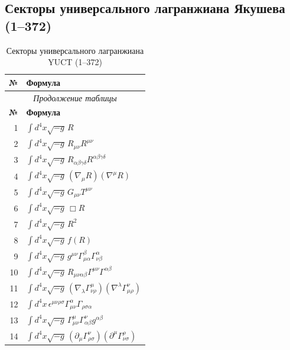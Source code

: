 \documentclass[12pt,a4paper]{article}
\begin{document}
	\subsection{Секторы универсального лагранжиана Якушева (1–372)}
	\label{sec:sectors}
	
	\scriptsize
	\begin{longtable}{r p{}}
		\caption{Секторы универсального лагранжиана YUCT (1–372)}\label{tab:sectors-372}\\
		\toprule
		\textbf{№} & \textbf{Формула} \\
		\midrule
		\endfirsthead
		\multicolumn{2}{c}{\textit{Продолжение таблицы}}\\
		\toprule
		\textbf{№} & \textbf{Формула} \\
		\midrule
		\endhead
		\bottomrule
		\endfoot
		1 & \(\displaystyle \int d^4x\sqrt{-g}\,R\) \\
		2 & \(\displaystyle \int d^4x\sqrt{-g}\,R_{\mu\nu}R^{\mu\nu}\) \\
		3 & \(\displaystyle \int d^4x\sqrt{-g}\,R_{\alpha\beta\gamma\delta}R^{\alpha\beta\gamma\delta}\) \\
		4 & \(\displaystyle \int d^4x\sqrt{-g}\,(\nabla_\mu R)(\nabla^\mu R)\) \\
		5 & \(\displaystyle \int d^4x\sqrt{-g}\,G_{\mu\nu}T^{\mu\nu}\) \\
		6 & \(\displaystyle \int d^4x\sqrt{-g}\,\Box R\) \\
		7 & \(\displaystyle \int d^4x\sqrt{-g}\,R^2\) \\
		8 & \(\displaystyle \int d^4x\sqrt{-g}\,f(R)\) \\
		9 & \(\displaystyle \int d^4x\sqrt{-g}\,g^{\mu\nu}\Gamma^{\beta}_{\mu\alpha}\Gamma^{\alpha}_{\nu\beta}\) \\
		10 & \(\displaystyle \int d^4x\sqrt{-g}\,R_{\mu\nu\alpha\beta}\Gamma^{\mu\nu}\Gamma^{\alpha\beta}\) \\
		11 & \(\displaystyle \int d^4x\sqrt{-g}\,(\nabla_\lambda\Gamma^{\mu}_{\nu\rho})(\nabla^\lambda\Gamma^{\nu}_{\mu\rho})\) \\
		12 & \(\displaystyle \int d^4x\,\epsilon^{\mu\nu\rho\sigma}\Gamma^{\alpha}_{\mu\nu}\Gamma_{\rho\sigma\alpha}\) \\
		13 & \(\displaystyle \int d^4x\sqrt{-g}\,\Gamma^{\mu}_{\mu\nu}\Gamma^{\nu}_{\alpha\beta}g^{\alpha\beta}\) \\
		14 & \(\displaystyle \int d^4x\sqrt{-g}\,(\partial_\mu\Gamma^{\nu}_{\rho\sigma})(\partial^\mu\Gamma^{\rho}_{\nu\sigma})\) \\

\end{longtable}
\end{document}
